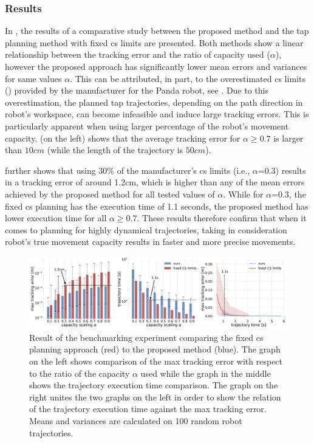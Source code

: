 \subsubsection*{Results} 
In , the results of a comparative study between the proposed method and the \gls{tap} planning method with fixed \gls{cs} limits are presented. Both methods show a linear relationship between the tracking error and the ratio of capacity used ($\alpha$), however the proposed approach has significantly lower mean errors and variances for same values $\alpha$. This can be attributed, in part, to the overestimated \gls{cs} limits () provided by the manufacturer for the Panda robot, see . Due to this overestimation, the planned \gls{tap} trajectories, depending on the path direction in robot's workspace, can become infeasible and induce large tracking errors. This is particularly apparent when using larger percentage of the robot's movement capacity.  (on the left) shows that the average tracking error for $\alpha \geq 0.7$ is larger than $10cm$ (while the length of the trajectory is $50cm$).

 further shows that using 30\% of the manufacturer's \gls{cs} limits (i.e., $\alpha$=0.3) results in a tracking error of around 1.2cm, which is higher than any of the mean errors achieved by the proposed method for all tested values of $\alpha$.
While for $\alpha$=0.3, the fixed \gls{cs} planning has the execution time of 1.1 seconds, the proposed method has lower execution time for all $\alpha\geq0.7$. 
These results therefore confirm that when it comes to planning for highly dynamical trajectories, taking in consideration robot's true movement capacity results in faster and more precise movements. 


\begin{figure}[!h]
    \centering
    \includegraphics[width=\linewidth]{Papers/imgs/comparison_fixed_cs.pdf}
    \caption{Result of the benchmarking experiment comparing the fixed \gls{cs} planning approach (red) to the proposed method (blue). The graph on the left shows comparison of the max tracking error with respect to the ratio of the capacity $\alpha$ used while the graph in the middle shows the trajectory execution time comparison. The graph on the right unites the two graphs on the left in order to show the relation of the trajectory execution time against the max tracking error. Means and variances are calculated on 100 random robot trajectories. }
    \label{fig:comp_fixed_cs}
\end{figure}


